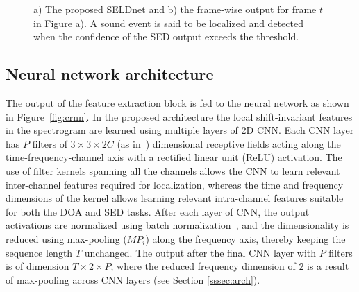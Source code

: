 \documentclass[journal]{IEEEtran}
\begin{document}
\begin{figure}[htp]
  \centering  
    \vspace{20pt}
    \vspace{10pt}
  \caption{a) The proposed SELDnet and b) the frame-wise output for frame $t$ in Figure a). A sound event is said to be localized and detected when the confidence of the SED output exceeds the threshold.}
\end{figure}
\subsection{Neural network architecture}
The output of the feature extraction block is fed to the neural network as shown in Figure~\ref{fig:crnn}. In the proposed architecture the local shift-invariant features in the spectrogram are learned using multiple layers of 2D CNN. Each CNN layer has $P$ filters of $3\times3\times2C$ (as in~\cite{Adavanne2018_EUSIPCO}) dimensional receptive fields acting along the time-frequency-channel axis with a rectified linear unit (ReLU) activation. The use of filter kernels spanning all the channels allows the CNN to learn relevant inter-channel features required for localization, whereas the time and frequency dimensions of the kernel allows learning relevant intra-channel features suitable for both the DOA and SED tasks. After each layer of CNN, the output activations are normalized using batch normalization~\cite{batchNorm}, and the dimensionality is reduced using max-pooling ($MP_i$) along the frequency axis, thereby keeping the sequence length $T$ unchanged. The output after the final CNN layer with $P$ filters is of dimension $T\times2\times P$, where the reduced frequency dimension of $2$ is a result of max-pooling across CNN layers (see Section \ref{sssec:arch}). 
\end{document}
